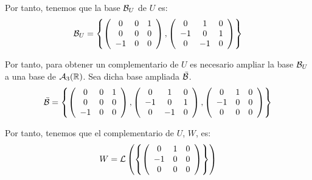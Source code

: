 \documentclass[12pt]{article}
\begin{document}
\begin{ejercicio}
\begin{enumerate}
        Por tanto, tenemos que la base $\mathcal{B}_U$ de $U$ es:
        \begin{equation*}
            \mathcal{B}_U=\left\{
            \left(\begin{array}{ccc}
                0 & 0 & 1 \\
                0 & 0 & 0 \\
                -1 & 0 & 0 \\
            \end{array}\right),
            \left(\begin{array}{ccc}
                0 & 1 & 0 \\
                -1 & 0 & 1 \\
                0 & -1 & 0 \\
            \end{array}\right)\right\}
        \end{equation*}

        Por tanto, para obtener un complementario de $U$ es necesario ampliar la base $\mathcal{B}_U$ a una base de $\mathcal{A}_3(\mathbb{R})$. Sea dicha base ampliada $\bar{\mathcal{B}}$.
        \begin{equation*}
            \bar{\mathcal{B}}=\left\{
            \left(\begin{array}{ccc}
                0 & 0 & 1 \\
                0 & 0 & 0 \\
                -1 & 0 & 0 \\
            \end{array}\right),
            \left(\begin{array}{ccc}
                0 & 1 & 0 \\
                -1 & 0 & 1 \\
                0 & -1 & 0 \\
            \end{array}\right),
            \left(\begin{array}{ccc}
                0 & 1 & 0 \\
                -1 & 0 & 0 \\
                0 & 0 & 0 \\
            \end{array}\right)\right\}
        \end{equation*}

        Por tanto, tenemos que el complementario de $U$, $W$, es:
        \begin{equation*}
          W=\mathcal{L}\left(\left\{\left(\begin{array}{ccc}
                0 & 1 & 0 \\
                -1 & 0 & 0 \\
                0 & 0 & 0 \\
            \end{array}\right)\right\}\right)  
        \end{equation*}


\end{enumerate}
\end{ejercicio}
\end{document}
